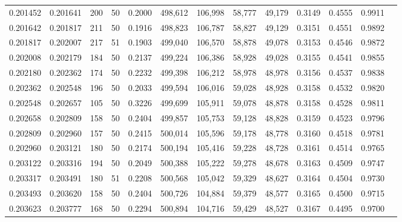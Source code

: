 \begin{tabular}{rrrrrrrrrrrrr}
0.201452 & 0.201641 &   200 &  50 &                                     0.2000 & 498,612 & 106,998 &  58,777 &  49,179 & 0.3149 & 0.4555 & 0.9911 \\
0.201642 & 0.201817 &   211 &  50 &                                     0.1916 & 498,823 & 106,787 &  58,827 &  49,129 & 0.3151 & 0.4551 & 0.9892 \\
0.201817 & 0.202007 &   217 &  51 &                                     0.1903 & 499,040 & 106,570 &  58,878 &  49,078 & 0.3153 & 0.4546 & 0.9872 \\
0.202008 & 0.202179 &   184 &  50 &                                     0.2137 & 499,224 & 106,386 &  58,928 &  49,028 & 0.3155 & 0.4541 & 0.9855 \\
0.202180 & 0.202362 &   174 &  50 &                                     0.2232 & 499,398 & 106,212 &  58,978 &  48,978 & 0.3156 & 0.4537 & 0.9838 \\
0.202362 & 0.202548 &   196 &  50 &                                     0.2033 & 499,594 & 106,016 &  59,028 &  48,928 & 0.3158 & 0.4532 & 0.9820 \\
0.202548 & 0.202657 &   105 &  50 &                                     0.3226 & 499,699 & 105,911 &  59,078 &  48,878 & 0.3158 & 0.4528 & 0.9811 \\
0.202658 & 0.202809 &   158 &  50 &                                     0.2404 & 499,857 & 105,753 &  59,128 &  48,828 & 0.3159 & 0.4523 & 0.9796 \\
0.202809 & 0.202960 &   157 &  50 &                                     0.2415 & 500,014 & 105,596 &  59,178 &  48,778 & 0.3160 & 0.4518 & 0.9781 \\
0.202960 & 0.203121 &   180 &  50 &                                     0.2174 & 500,194 & 105,416 &  59,228 &  48,728 & 0.3161 & 0.4514 & 0.9765 \\
0.203122 & 0.203316 &   194 &  50 &                                     0.2049 & 500,388 & 105,222 &  59,278 &  48,678 & 0.3163 & 0.4509 & 0.9747 \\
0.203317 & 0.203491 &   180 &  51 &                                     0.2208 & 500,568 & 105,042 &  59,329 &  48,627 & 0.3164 & 0.4504 & 0.9730 \\
0.203493 & 0.203620 &   158 &  50 &                                     0.2404 & 500,726 & 104,884 &  59,379 &  48,577 & 0.3165 & 0.4500 & 0.9715 \\
0.203623 & 0.203777 &   168 &  50 &                                     0.2294 & 500,894 & 104,716 &  59,429 &  48,527 & 0.3167 & 0.4495 & 0.9700 \\

\end{tabular}
